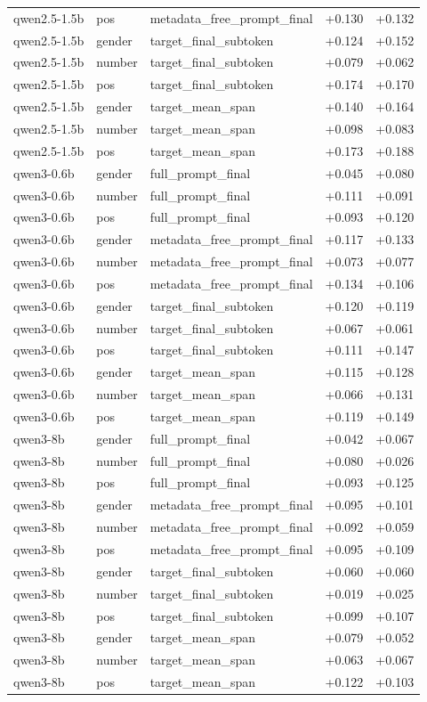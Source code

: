 \begin{tabular}{lllrr}
qwen2.5-1.5b & pos & metadata_free_prompt_final & +0.130 & +0.132 \\
qwen2.5-1.5b & gender & target_final_subtoken & +0.124 & +0.152 \\
qwen2.5-1.5b & number & target_final_subtoken & +0.079 & +0.062 \\
qwen2.5-1.5b & pos & target_final_subtoken & +0.174 & +0.170 \\
qwen2.5-1.5b & gender & target_mean_span & +0.140 & +0.164 \\
qwen2.5-1.5b & number & target_mean_span & +0.098 & +0.083 \\
qwen2.5-1.5b & pos & target_mean_span & +0.173 & +0.188 \\
qwen3-0.6b & gender & full_prompt_final & +0.045 & +0.080 \\
qwen3-0.6b & number & full_prompt_final & +0.111 & +0.091 \\
qwen3-0.6b & pos & full_prompt_final & +0.093 & +0.120 \\
qwen3-0.6b & gender & metadata_free_prompt_final & +0.117 & +0.133 \\
qwen3-0.6b & number & metadata_free_prompt_final & +0.073 & +0.077 \\
qwen3-0.6b & pos & metadata_free_prompt_final & +0.134 & +0.106 \\
qwen3-0.6b & gender & target_final_subtoken & +0.120 & +0.119 \\
qwen3-0.6b & number & target_final_subtoken & +0.067 & +0.061 \\
qwen3-0.6b & pos & target_final_subtoken & +0.111 & +0.147 \\
qwen3-0.6b & gender & target_mean_span & +0.115 & +0.128 \\
qwen3-0.6b & number & target_mean_span & +0.066 & +0.131 \\
qwen3-0.6b & pos & target_mean_span & +0.119 & +0.149 \\
qwen3-8b & gender & full_prompt_final & +0.042 & +0.067 \\
qwen3-8b & number & full_prompt_final & +0.080 & +0.026 \\
qwen3-8b & pos & full_prompt_final & +0.093 & +0.125 \\
qwen3-8b & gender & metadata_free_prompt_final & +0.095 & +0.101 \\
qwen3-8b & number & metadata_free_prompt_final & +0.092 & +0.059 \\
qwen3-8b & pos & metadata_free_prompt_final & +0.095 & +0.109 \\
qwen3-8b & gender & target_final_subtoken & +0.060 & +0.060 \\
qwen3-8b & number & target_final_subtoken & +0.019 & +0.025 \\
qwen3-8b & pos & target_final_subtoken & +0.099 & +0.107 \\
qwen3-8b & gender & target_mean_span & +0.079 & +0.052 \\
qwen3-8b & number & target_mean_span & +0.063 & +0.067 \\
qwen3-8b & pos & target_mean_span & +0.122 & +0.103 \\
\end{tabular}
